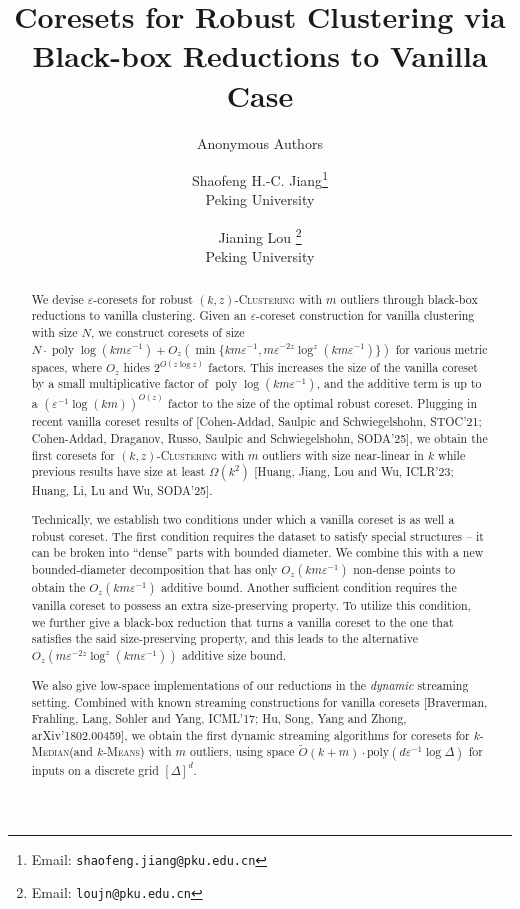 \documentclass[letterpaper,11pt]{article}
\title{Coresets for Robust Clustering via Black-box Reductions to Vanilla Case}
\author{Anonymous Authors}
\date{}
\author{
     Shaofeng H.-C. Jiang\thanks{
     Email: \texttt{shaofeng.jiang@pku.edu.cn}
     }\\
     Peking University
     \and
     Jianing Lou
     \thanks{Email: \texttt{loujn@pku.edu.cn}}\\
     Peking University
 }
\theoremstyle{plain}
\theoremstyle{definition}
\theoremstyle{remark}
\DeclareMathOperator{\poly}{poly}
\newcommand{\eps}{\varepsilon}
\newcommand{\ProblemName}[1]{\textsc{#1}}
\newcommand{\kMedian}{\ProblemName{$k$-Median}\xspace}
\newcommand{\kMeans}{\ProblemName{$k$-Means}\xspace}
\newcommand{\kzC}{\ProblemName{$(k,z)$-Clustering}\xspace}
\begin{document}
\maketitle

\begin{abstract}

We devise $\varepsilon$-coresets for robust \kzC with $m$ outliers through black-box reductions to vanilla clustering. 
Given an $\varepsilon$-coreset construction for vanilla clustering with size $N$, 
we construct coresets of size 
$N\cdot \poly\log(km\eps^{-1}) + O_z\left(\min\{ km\varepsilon^{-1}, m \varepsilon^{-2z}\log^z(km\eps^{-1}) \}\right)$
for various metric spaces, where $O_z$ hides $2^{O(z\log z)}$ factors.
This increases the size of the vanilla coreset by a small multiplicative factor of $\poly\log(km\eps^{-1})$, and the additive term is up to a $(\varepsilon^{-1}\log (km))^{O(z)}$ factor to the size of the optimal robust coreset.
Plugging in recent vanilla coreset results of
[Cohen-Addad, Saulpic and Schwiegelshohn, STOC'21; 
Cohen-Addad, Draganov, Russo, Saulpic and Schwiegelshohn, SODA'25], 
we obtain the first coresets for \kzC with $m$ outliers with size near-linear in $k$ while previous results have size at least $\Omega(k^2)$
[Huang, Jiang, Lou and Wu, ICLR'23; 
Huang, Li, Lu and Wu, SODA'25].


Technically, we establish two conditions under which a vanilla coreset is as well a robust coreset.
The first condition requires the dataset to satisfy special structures -- it can be broken into ``dense'' parts with bounded diameter.
We combine this with a new bounded-diameter decomposition that has only $O_z(km \varepsilon^{-1})$ non-dense points to obtain the $O_z(km \varepsilon^{-1})$ additive bound. 
Another sufficient condition requires the vanilla coreset to possess an extra size-preserving property.
To utilize this condition, we further give a black-box reduction that turns a vanilla coreset to the one that satisfies the said size-preserving property,
and this leads to the alternative $O_z(m\varepsilon^{-2z}\log^{z}(km\eps^{-1}))$ additive size bound.

We also give low-space implementations of our reductions in the \emph{dynamic} streaming setting.
Combined with known streaming constructions for vanilla coresets
[Braverman, Frahling, Lang, Sohler and Yang, ICML'17; 
Hu, Song, Yang and Zhong, arXiv'1802.00459],
we obtain the first dynamic streaming algorithms for coresets for \kMedian (and \kMeans) with $m$ outliers,
using space $\tilde{O}(k + m) \cdot \mathrm{poly}(d\varepsilon^{-1}\log \Delta)$
for inputs on a discrete grid $[\Delta]^d$.


\end{abstract}
\end{document}

